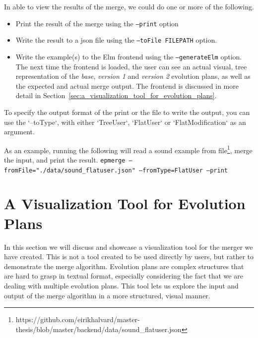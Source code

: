 \documentclass[a4paper,english]{ifimaster}
\begin{document}
In able to view the results of the merge, we could do one or more of the following.

\begin{itemize}
  \item Print the result of the merge using the \texttt{--print} option
  \item Write the result to a json file using the \texttt{--toFile FILEPATH} option.
  \item Write the example(s) to the Elm frontend using the \texttt{--generateElm} option. The next time the frontend is loaded, the user can see an actual visual, tree representation of the \textit{base}, \textit{version 1} and \textit{version 2} evolution plans, as well as the expected and actual merge output. The frontend is discussed in more detail in Section~\vref{sec:a_visualization_tool_for_evolution_plans}.
\end{itemize}

To specify the output format of the print or the file to write the output, you can use the `--toType`, with either `TreeUser`, `FlatUser` or `FlatModification` as an argument.

As an example, running the following will read a sound example from file\footnote{https://github.com/eirikhalvard/master-thesis/blob/master/backend/data/sound\_flatuser.json}, merge the input, and print the result. \texttt{epmerge --fromFile="./data/sound\_flatuser.json" --fromType=FlatUser --print}

\section{A Visualization Tool for Evolution Plans}%
\label{sec:a_visualization_tool_for_evolution_plans}

In this section we will discuss and showcase a visualization tool for the merger we have created. This is not a tool created to be used directly by users, but rather to demonstrate the merge algorithm. Evolution plans are complex structures that are hard to grasp in textual format, especially considering the fact that we are dealing with multiple evolution plans. This tool lets us explore the input and output of the merge algorithm in a more structured, visual manner.
\end{document}
